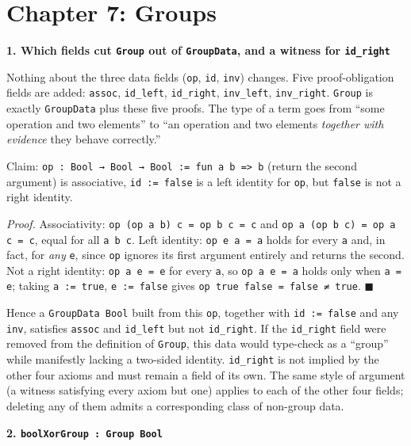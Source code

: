 \section{Chapter 7: Groups}\label{sec:15-appendix-solutions:07-chapter-7:1}

\textbf{1. Which fields cut \texttt{Group} out of \texttt{GroupData}, and a witness for \texttt{id\_\allowbreak{}right}}

Nothing about the three data fields (\texttt{op}, \texttt{id}, \texttt{inv}) changes. Five proof-obligation fields are added: \texttt{assoc}, \texttt{id\_\allowbreak{}left}, \texttt{id\_\allowbreak{}right}, \texttt{inv\_\allowbreak{}left}, \texttt{inv\_\allowbreak{}right}. \texttt{Group} is exactly \texttt{GroupData} plus these five proofs. The type of a term goes from ``some operation and two elements'' to ``an operation and two elements \emph{together with evidence} they behave correctly.''

Claim: \texttt{op : Bool → Bool → Bool := fun a b => b} (return the second argument) is associative, \texttt{id := false} is a left identity for \texttt{op}, but \texttt{false} is not a right identity.

\emph{Proof.} Associativity: \texttt{op (op a b) c = op b c = c} and \texttt{op a (op b c) = op a c = c}, equal for all \texttt{a b c}. Left identity: \texttt{op e a = a} holds for every \texttt{a} and, in fact, for \emph{any} \texttt{e}, since \texttt{op} ignores its first argument entirely and returns the second. Not a right identity: \texttt{op a e = e} for every \texttt{a}, so \texttt{op a e = a} holds only when \texttt{a = e}; taking \texttt{a := true}, \texttt{e := false} gives \texttt{op true false = false ≠ true}. \(\blacksquare\)

Hence a \texttt{GroupData Bool} built from this \texttt{op}, together with \texttt{id := false} and any \texttt{inv}, satisfies \texttt{assoc} and \texttt{id\_\allowbreak{}left} but not \texttt{id\_\allowbreak{}right}. If the \texttt{id\_\allowbreak{}right} field were removed from the definition of \texttt{Group}, this data would type-check as a ``group'' while manifestly lacking a two-sided identity. \texttt{id\_\allowbreak{}right} is not implied by the other four axioms and must remain a field of its own. The same style of argument (a witness satisfying every axiom but one) applies to each of the other four fields; deleting any of them admits a corresponding class of non-group data.

\textbf{2. \texttt{boolXorGroup : Group Bool}}

